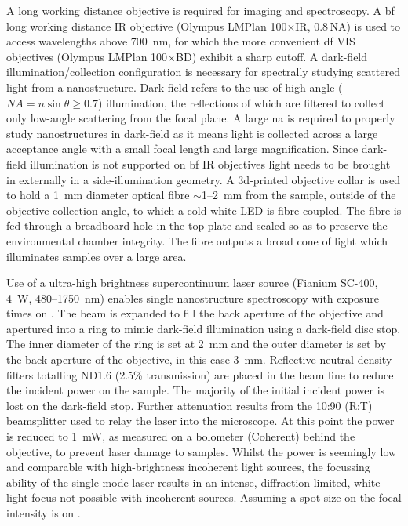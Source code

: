 \documentclass{article}
\begin{document}
A long working distance objective is required for imaging and spectroscopy. A \gls{bf} long working distance IR objective (Olympus LMPlan 100$\times$IR, 0.8\,NA) is used to access wavelengths above \SI{700}{nm}, for which the more convenient \gls{df} VIS objectives (Olympus LMPlan 100$\times$BD) exhibit a sharp cutoff. A dark-field illumination/collection configuration is necessary for spectrally studying scattered light from a nanostructure. Dark-field refers to the use of high-angle ($\mathit{NA}=n\sin\theta\geq0.7$) illumination, the reflections of which are filtered to collect only low-angle scattering from the focal plane. A large \gls{na} is required to properly study nanostructures in dark-field as it means light is collected across a large acceptance angle with a small focal length and large magnification. Since dark-field illumination is not supported on \gls{bf} IR objectives light needs to be brought in externally in a side-illumination geometry. A 3d-printed objective collar is used to hold a \SI{1}{mm} diameter optical fibre $\sim$1--\SI{2}{mm} from the sample, outside of the objective collection angle, to which a cold white LED is fibre coupled. The fibre is fed through a breadboard hole in the top plate and sealed so as to preserve the environmental chamber integrity. The fibre outputs a broad cone of light which illuminates samples over a large area.

Use of a ultra-high brightness supercontinuum laser source (Fianium SC-400, \SI{4}{W}, 480--\SI{1750}{nm}) enables single nanostructure spectroscopy with exposure times on . The beam is expanded to fill the back aperture of the objective and apertured into a ring to mimic dark-field illumination using a dark-field disc stop. The inner diameter of the ring is set at \SI{2}{mm} and the outer diameter is set by the back aperture of the objective, in this case \SI{3}{mm}.
Reflective neutral density filters totalling ND1.6 (2.5\% transmission) are placed in the beam line to reduce the incident power on the sample. The majority of the initial incident power is lost on the dark-field stop. Further attenuation results from the 10:90 (R:T) beamsplitter used to relay the laser into the microscope. At this point the power is reduced to \SI{1}{mW}, as measured on a bolometer (Coherent) behind the objective, to prevent laser damage to samples. Whilst the power is seemingly low and comparable with high-brightness incoherent light sources, the focussing ability of the single mode laser results in an intense, diffraction-limited, white light focus not possible with incoherent sources. Assuming a spot size on  the focal intensity is on .
\end{document}
